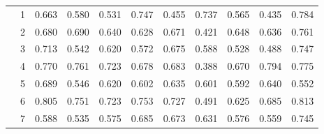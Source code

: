 \documentclass[runningheads]{llncs}
\begin{document}
\begin{table}[t!]
\begin{center}
\begin{tabular}{ccccccccccc}
            	            &1 &\cellcolor{blue!60}0.663 &\cellcolor{blue!50}0.580  &\cellcolor{blue!30}0.531  &\cellcolor{blue!70}0.747   &\cellcolor{blue!20}0.455     &\cellcolor{blue!60}0.737      &\cellcolor{blue!40}0.565    &\cellcolor{blue!10}0.435     &\cellcolor{blue!80}\color{white}0.784\\
            	            
            	            &2  &\cellcolor{blue!60}0.680 &\cellcolor{blue!70}0.690 &\cellcolor{blue!30}0.640  &\cellcolor{blue!20}0.628    &\cellcolor{blue!50}0.671     &\cellcolor{blue!15}0.421      &\cellcolor{blue!40}0.648    &\cellcolor{blue!25}0.636    &\cellcolor{blue!80}\color{white}0.761\\
            	            
            	            &3  &\cellcolor{blue!70}0.713 &\cellcolor{blue!20}0.542 &\cellcolor{blue!50}0.620 
            	            &\cellcolor{blue!30}0.572    &\cellcolor{blue!60}0.675     &\cellcolor{blue!40}0.588      &\cellcolor{blue!10}0.528    &\cellcolor{blue!5}0.488    &\cellcolor{blue!80}\color{white}0.747\\
            	            
            	            &4 &\cellcolor{blue!60}0.770 &\cellcolor{blue!50}0.761 &\cellcolor{blue!40}0.723  &\cellcolor{blue!25}0.678   &\cellcolor{blue!30}0.683     &\cellcolor{blue!15}0.388      &\cellcolor{blue!20}0.670    &\cellcolor{blue!80}\color{white}0.794    &\cellcolor{blue!70}0.775\\
            	            
	   \cite{krizhevsky2009learning}          &5 &\cellcolor{blue!80}\color{white}0.689 &\cellcolor{blue!5}0.546  &\cellcolor{blue!50}0.620 &\cellcolor{blue!40}0.602     &\cellcolor{blue!60}0.635     &\cellcolor{blue!30}0.601      &\cellcolor{blue!20}0.592    &\cellcolor{blue!70}0.640        &\cellcolor{blue!10}0.552\\
                            &6 &\cellcolor{blue!70}0.805 &\cellcolor{blue!50}0.751  &\cellcolor{blue!30}0.723 &\cellcolor{blue!60}0.753    &\cellcolor{blue!40}0.727     &\cellcolor{blue!5}0.491      &\cellcolor{blue!20}0.625    &\cellcolor{blue!25}0.685       &\cellcolor{blue!80}\color{white}0.813\\
                            
            	            &7 &\cellcolor{blue!40}0.588 &\cellcolor{blue!5}0.535  &\cellcolor{blue!20}0.575  &\cellcolor{blue!70}0.685    &\cellcolor{blue!60}0.673     &\cellcolor{blue!50}0.631      &\cellcolor{blue!30}0.576    &\cellcolor{blue!15}0.559      &\cellcolor{blue!80}\color{white}0.745\\
            	            

\end{tabular}
\end{center}
\end{table}
\end{document}
